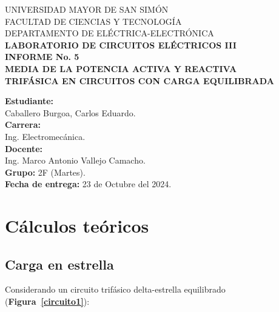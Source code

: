 \documentclass[letter,11pt]{article}
\begin{document}
\begin{titlepage}
    \begin{center}
        {\Large UNIVERSIDAD MAYOR DE SAN SIMÓN}\\
        \vspace*{0.15cm}
        {\large FACULTAD DE CIENCIAS Y TECNOLOGÍA}\\
        \vspace*{0.10cm}
        DEPARTAMENTO DE ELÉCTRICA-ELECTRÓNICA\\
        \vspace*{3.0cm}
        {\Large \textbf{LABORATORIO DE CIRCUITOS ELÉCTRICOS III}}\\
        \vspace*{0.3cm}
        {\Large \textbf{INFORME No. 5}}\\
        \vspace*{3.5cm}
        {\Large \textbf{MEDIA DE LA POTENCIA ACTIVA Y REACTIVA\\
        TRIFÁSICA EN CIRCUITOS CON CARGA EQUILIBRADA}}\\
    \end{center}

    \vspace*{5.8cm}
    \leftskip=7.95cm
    \noindent
    \textbf{Estudiante:}\\
    Caballero Burgoa, Carlos Eduardo.\\
    \newline
    \textbf{Carrera:}\\
    Ing. Electromecánica.\\
    \newline
    \textbf{Docente:}\\
    Ing. Marco Antonio Vallejo Camacho.\\
    \newline
    \textbf{Grupo:} 2F (Martes).\\
\textbf{Fecha de entrega:} 23 de Octubre del 2024.\\
\end{titlepage}

\section{Cálculos teóricos}

\subsection{Carga en estrella}
Considerando un circuito trifásico delta-estrella equilibrado
(\textbf{Figura~\ref{circuito1}}):
\end{document}
